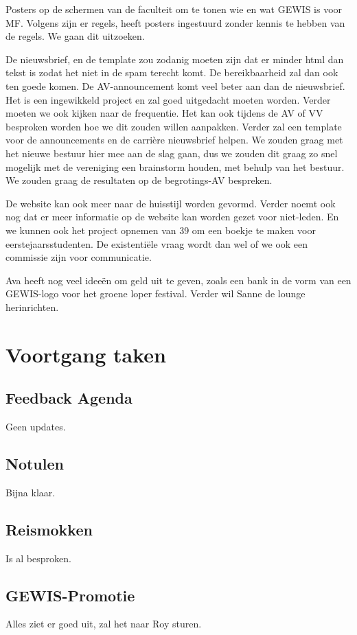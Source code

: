 \documentclass[
dutch
]{GEWISMinutes}
\begin{document}
	Posters op de schermen van de faculteit om te tonen wie en wat GEWIS is voor MF. Volgens \rink zijn er regels, \nicky heeft posters ingestuurd zonder kennis te hebben van de regels. We gaan dit uitzoeken.
	
	De nieuwsbrief, en de template zou zodanig moeten zijn dat er minder html dan tekst is zodat het niet in de spam terecht komt. De bereikbaarheid zal dan ook ten goede komen. De AV-announcement komt veel beter aan dan de nieuwsbrief. Het is een ingewikkeld project en zal goed uitgedacht moeten worden. Verder moeten we ook kijken naar de frequentie. Het kan ook tijdens de AV of VV besproken worden hoe we dit zouden willen aanpakken. Verder zal een template voor de announcements en de carri\`ere nieuwsbrief helpen. We zouden graag met het nieuwe bestuur hier mee aan de slag gaan, dus we zouden dit graag zo snel mogelijk met de vereniging een brainstorm houden, met behulp van het bestuur. We zouden graag de resultaten op de begrotings-AV bespreken.
	
	De website kan ook meer naar de huisstijl worden gevormd. Verder noemt \ava ook nog dat er meer informatie op de website kan worden gezet voor niet-leden. En we kunnen ook het project opnemen van 39 om een boekje te maken voor eerstejaarsstudenten. De existenti\"ele vraag wordt dan wel of we ook een commissie zijn voor communicatie.
	
	Ava heeft nog veel idee\"en om geld uit te geven, zoals een bank in de vorm van een GEWIS-logo voor het groene loper festival. Verder wil Sanne de lounge herinrichten.
	
	\section{Voortgang taken}
	
	\subsection{Feedback Agenda}
	Geen updates.
	
	\subsection{Notulen}
	Bijna klaar.
	
	\subsection{Reismokken}
	Is al besproken.
	
	\subsection{GEWIS-Promotie}
	Alles ziet er goed uit, \ava zal het naar Roy sturen.
	
\end{document}
